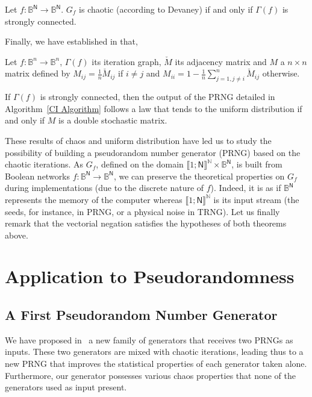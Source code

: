 \documentclass{article}
\begin{document}
\begin{theorem}
\label{Th:Caractérisation   des   IC   chaotiques}  
Let $f:\mathds{B}^\mathsf{N}\to\mathds{B}^\mathsf{N}$. $G_f$ is chaotic  (according to  Devaney) 
if and only if $\Gamma(f)$ is strongly connected.
\end{theorem}

Finally, we have established in \cite{bcgr11:ip} that,
\begin{theorem}
  Let $f: \mathds{B}^{n} \rightarrow \mathds{B}^{n}$, $\Gamma(f)$ its
  iteration graph, $\check{M}$ its adjacency
  matrix and $M$
  a $n\times n$ matrix defined by 
  $
  M_{ij} = \frac{1}{n}\check{M}_{ij}$ if $i \neq j$ and  
  $M_{ii} = 1 - \frac{1}{n} \sum\limits_{j=1, j\neq i}^n \check{M}_{ij}$ otherwise.
  
  If $\Gamma(f)$ is strongly connected, then 
  the output of the PRNG detailed in Algorithm~\ref{CI Algorithm} follows 
  a law that tends to the uniform distribution 
  if and only if $M$ is a double stochastic matrix.
\end{theorem} 


These results of chaos and uniform distribution have led us to study the possibility of building a
pseudorandom number generator (PRNG) based on the chaotic iterations. 
As $G_f$, defined on the domain   $\llbracket 1 ;  \mathsf{N} \rrbracket^{\mathds{N}} 
\times \mathds{B}^\mathsf{N}$, is built from Boolean networks $f : \mathds{B}^\mathsf{N}
\rightarrow \mathds{B}^\mathsf{N}$, we can preserve the theoretical properties on $G_f$
during implementations (due to the discrete nature of $f$). Indeed, it is as if
$\mathds{B}^\mathsf{N}$ represents the memory of the computer whereas $\llbracket 1 ;  \mathsf{N}
\rrbracket^{\mathds{N}}$ is its input stream (the seeds, for instance, in PRNG, or a physical noise in TRNG).
Let us finally remark that the vectorial negation satisfies the hypotheses of both theorems above.

\section{Application to Pseudorandomness}
\label{sec:pseudorandom}

\subsection{A First Pseudorandom Number Generator}

We have proposed in~\cite{bgw09:ip} a new family of generators that receives 
two PRNGs as inputs. These two generators are mixed with chaotic iterations, 
leading thus to a new PRNG that improves the statistical properties of each
generator taken alone. Furthermore, our generator 
possesses various chaos properties that none of the generators used as input
present.
\end{document}

